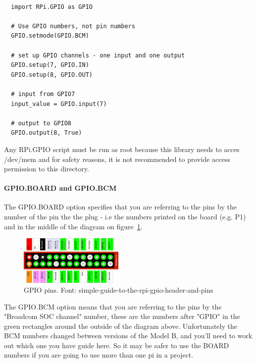 \documentclass{acm_proc_article-sp}
\begin{document}
\renewcommand{\theFancyVerbLine}{
  \sffamily\textcolor[rgb]{0.5,0.5,0.5}{\scriptsize\arabic{FancyVerbLine}}}
\begin{verbatim}

  import RPi.GPIO as GPIO

  # Use GPIO numbers, not pin numbers
  GPIO.setmode(GPIO.BCM) 

  # set up GPIO channels - one input and one output
  GPIO.setup(7, GPIO.IN) 
  GPIO.setup(8, GPIO.OUT)

  # input from GPIO7
  input_value = GPIO.input(7)

  # output to GPIO8
  GPIO.output(8, True)
\end{verbatim}
Any RPi.GPIO script must be run as root because this library needs to acces /dev/mem and for safety reasons, it is not recommended to provide access permission to this directory.


\paragraph{GPIO.BOARD and GPIO.BCM}
The GPIO.BOARD option specifies that you are referring to the pins by the number of the pin the the plug - i.e the numbers printed on the board (e.g. P1) and in the middle of the diagram on figure~\ref{fig:ModelAB}.
\begin{figure}[h]
    \includegraphics[width=0.45\textwidth,natwidth=610,natheight=642]{pictures/ModelAB.png}
    \caption{GPIO pins. Font: simple-guide-to-the-rpi-gpio-header-and-pins}
    \label{fig:ModelAB}
\end{figure}
\newline
\newline
The GPIO.BCM option means that you are referring to the pins by the "Broadcom SOC channel" number, these are the numbers after "GPIO" in the green rectangles around the outside of the diagram above.
\newline
\newline
Unfortunately the BCM numbers changed between versions of the Model B, and you'll need to work out which one you have guide here. So it may be safer to use the BOARD numbers if you are going to use more than one pi in a project.
\end{document}
